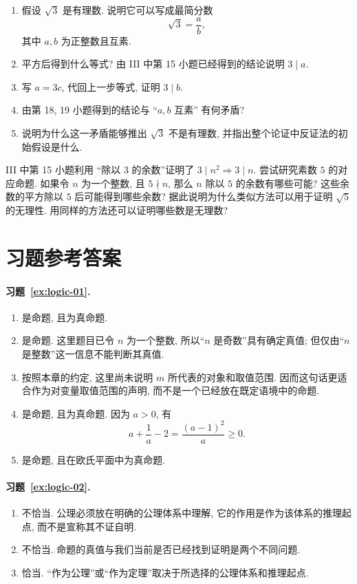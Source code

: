 \documentclass[usesamecnt, thmcnt=section, lang=cn, newtx, 10pt, scheme=chinese]{elegantbook}
\begin{document}
\begin{enumerate}[label=\textbf{\arabic*.}, resume=comprehensive]
  \item 假设 $\sqrt3$ 是有理数. 说明它可以写成最简分数
  \[
    \sqrt3=\frac{a}{b},
  \]
  其中 $a,b$ 为正整数且互素.
  \item 平方后得到什么等式? 由 III 中第 15 小题已经得到的结论说明 $3\mid a$.
  \item 写 $a=3c$, 代回上一步等式, 证明 $3\mid b$.
  \item 由第 18, 19 小题得到的结论与 ``$a,b$ 互素'' 有何矛盾?
  \item 说明为什么这一矛盾能够推出 $\sqrt3$ 不是有理数, 并指出整个论证中反证法的初始假设是什么.
\end{enumerate}

\begin{challenge}
\label{ch:logic-07}
III 中第 15 小题利用 ``除以 $3$ 的余数''证明了 $3\mid n^2\Rightarrow3\mid n$. 尝试研究素数 $5$ 的对应命题. 如果令 $n$ 为一个整数, 且 $5\nmid n$, 那么 $n$ 除以 $5$ 的余数有哪些可能? 这些余数的平方除以 $5$ 后可能得到哪些余数? 据此说明为什么类似方法可以用于证明 $\sqrt5$ 的无理性. 用同样的方法还可以证明哪些数是无理数?
\end{challenge}

\newpage


\section{习题参考答案}

\paragraph*{习题~\ref{ex:logic-01}.}
\begin{enumerate}[label=\rm(\arabic*)]
  \item 是命题, 且为真命题.
  \item 是命题. 这里题目已令 $n$ 为一个整数, 所以``$n$ 是奇数''具有确定真值; 但仅由``$n$ 是整数''这一信息不能判断其真值.
  \item 按照本章的约定, 这里尚未说明 $m$ 所代表的对象和取值范围. 因而这句话更适合作为对变量取值范围的声明, 而不是一个已经放在既定语境中的命题.
  \item 是命题, 且为真命题. 因为 $a>0$, 有
  \[
    a+\frac1a-2=\frac{(a-1)^2}{a}\geq0.
  \]
  \item 是命题, 且在欧氏平面中为真命题.
\end{enumerate}

\paragraph*{习题~\ref{ex:logic-02}.}
\begin{enumerate}[label=\rm(\arabic*)]
  \item 不恰当. 公理必须放在明确的公理体系中理解, 它的作用是作为该体系的推理起点, 而不是宣称其不证自明.
  \item 不恰当. 命题的真值与我们当前是否已经找到证明是两个不同问题.
  \item 恰当. ``作为公理''或``作为定理''取决于所选择的公理体系和推理起点.
\end{enumerate}
\end{document}
